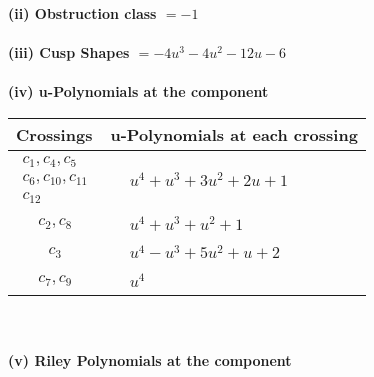 \documentclass[1p]{elsarticle_modified}
\theoremstyle{definition}
\begin{document}
\flushleft \textbf{(ii) Obstruction class $= -1$}\\~\\
\flushleft \textbf{(iii) Cusp Shapes $= -4 u^3-4 u^2-12 u-6$}\\~\\
\newpage\renewcommand{\arraystretch}{1}
\flushleft \textbf{(iv) u-Polynomials at the component}\newline \\
\begin{tabular}{m{50pt}|m{274pt}}
Crossings & \hspace{64pt}u-Polynomials at each crossing \\
\hline $$\begin{aligned}c_{1},c_{4},c_{5}\\c_{6},c_{10},c_{11}\\c_{12}\end{aligned}$$&$\begin{aligned}
&u^4+u^3+3 u^2+2 u+1
\end{aligned}$\\
\hline $$\begin{aligned}c_{2},c_{8}\end{aligned}$$&$\begin{aligned}
&u^4+u^3+u^2+1
\end{aligned}$\\
\hline $$\begin{aligned}c_{3}\end{aligned}$$&$\begin{aligned}
&u^4- u^3+5 u^2+u+2
\end{aligned}$\\
\hline $$\begin{aligned}c_{7},c_{9}\end{aligned}$$&$\begin{aligned}
&u^4
\end{aligned}$\\
\hline
\end{tabular}\\~\\
\newpage\renewcommand{\arraystretch}{1}
\flushleft \textbf{(v) Riley Polynomials at the component}\newline \\
\end{document}
